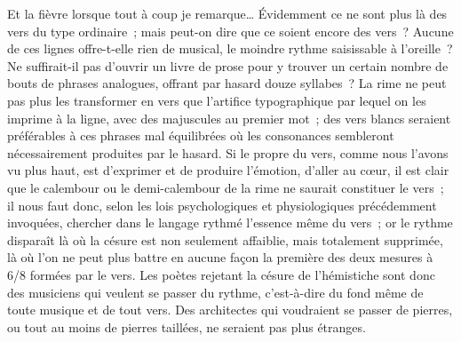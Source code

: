 \documentclass[french,twoside]{book} %
\begin{document}
\noindent Et la fièvre lorsque tout à coup je remarque…  Évidemment ce ne sont plus là des vers du type ordinaire ; mais peut-on dire que ce soient encore des vers ? Aucune de ces lignes offre-t-elle rien de musical, le moindre rythme saisissable à l’oreille ? Ne suffirait-il pas d’ouvrir un livre de prose pour y trouver un certain nombre de bouts de phrases analogues, offrant par hasard douze syllabes ? La rime ne peut pas plus les transformer en vers que l’artifice typographique par lequel on les imprime à la ligne, avec des majuscules au premier mot ; des vers blancs seraient  préférables à ces phrases mal équilibrées où les consonances sembleront nécessairement produites par le hasard. Si le propre du vers, comme nous l’avons vu plus haut, est d’exprimer et de produire l’émotion, d’aller au cœur, il est clair que le calembour ou le demi-calembour de la rime ne saurait constituer le vers ; il nous faut donc, selon les lois psychologiques et physiologiques précédemment invoquées, chercher dans le langage rythmé l’essence même du vers ; or le rythme disparaît là où la césure est non seulement affaiblie, mais totalement supprimée, là où l’on ne peut plus battre en aucune façon la première des deux mesures à 6/8 formées par le vers. Les poètes rejetant la césure de l’hémistiche sont donc des musiciens qui veulent se passer du rythme, c’est-à-dire du fond même de toute musique et de tout vers. Des architectes qui voudraient se passer de pierres, ou tout au moins de pierres taillées, ne seraient pas plus étranges.\par
\end{document}
